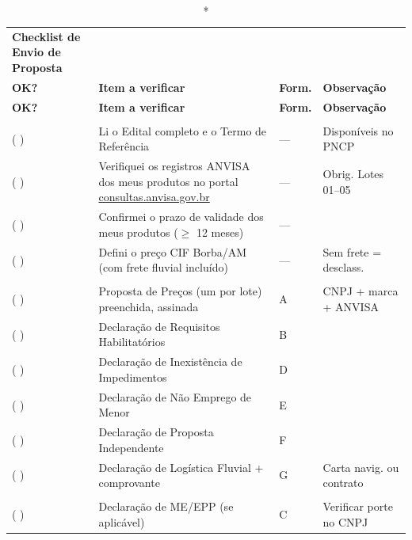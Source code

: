 \documentclass[12pt,a4paper]{article}
\begin{document}
\vspace{0.3cm}
\begin{longtable}{C{0.7cm} L{7.5cm} C{1.8cm} C{3.5cm}}
\caption*{\textbf{\color{navy}Checklist de Envio de Proposta}} \\
\color{white}\textbf{OK?} &
\color{white}\textbf{Item a verificar} &
\color{white}\textbf{Form.} &
\color{white}\textbf{Observação} \\
\toprule
\endfirsthead
{}
\color{white}\textbf{OK?} &
\color{white}\textbf{Item a verificar} &
\color{white}\textbf{Form.} &
\color{white}\textbf{Observação} \\
\toprule
\endhead
\bottomrule\endfoot

 \\
( ) & Li o Edital completo e o Termo de Referência & --- &
  Disponíveis no PNCP \\
( ) & Verifiquei os registros ANVISA dos meus produtos no portal
  \url{consultas.anvisa.gov.br} & --- & Obrig. Lotes 01--05 \\
( ) & Confirmei o prazo de validade dos meus produtos ($\geq$ 12 meses) & --- & \\
( ) & Defini o preço CIF Borba/AM (com frete fluvial incluído) & --- &
  Sem frete = desclass. \\[2pt]

 \\
( ) & Proposta de Preços (um por lote) preenchida, assinada & A &
  CNPJ + marca + ANVISA \\
( ) & Declaração de Requisitos Habilitatórios & B & \\
( ) & Declaração de Inexistência de Impedimentos & D & \\
( ) & Declaração de Não Emprego de Menor & E & \\
( ) & Declaração de Proposta Independente & F & \\
( ) & Declaração de Logística Fluvial + comprovante & G &
  Carta navig. ou contrato \\[2pt]

 \\
( ) & Declaração de ME/EPP (se aplicável) & C &
  Verificar porte no CNPJ \\[2pt]


\end{longtable}
\end{document}
